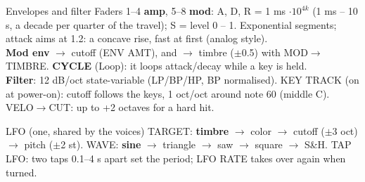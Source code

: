 \documentclass{article}
\begin{document}
\begin{minipage}[t]{68mm}\vspace{0pt}
\begin{card}{Envelopes and filter}
Faders 1--4 \textcolor{ampc}{\textbf{amp}}, 5--8 \textcolor{modc}{\textbf{mod}}: A, D, R =
1 ms \(\cdot 10^{4k}\) (1 ms -- 10 s, a decade per quarter of the travel); S = level 0 -- 1.
Exponential segments; attack aims at 1.2: a concave rise, fast at first (analog style).\\[0.5mm]
\textcolor{modc}{\textbf{Mod env}} \(\to\) cutoff (ENV AMT), and \(\to\) timbre (\(\pm\)0.5) with
MOD\(\to\)TIMBRE. \textcolor{modc}{\textbf{CYCLE}} (Loop): it loops attack/decay while a key is held.\\[0.5mm]
\textcolor{fltc}{\textbf{Filter}}: 12 dB/oct state-variable (LP/BP/HP, BP normalised).
KEY TRACK (on at power-on): cutoff follows the keys, 1 oct/oct around note 60 (middle C).
VELO\(\to\)CUT: up to +2 octaves for a hard hit.
\end{card}
\begin{card}{LFO (one, shared by the voices)}
TARGET: \textbf{timbre} \(\to\) color \(\to\) cutoff (\(\pm\)3 oct) \(\to\) pitch (\(\pm\)2 st).\quad
WAVE: \textbf{sine} \(\to\) triangle \(\to\) saw \(\to\) square \(\to\) S\&H.\quad
TAP LFO: two taps 0.1--4 s apart set the period; LFO RATE takes over again when turned.
\end{card}
\end{minipage}\hfill
\end{document}
